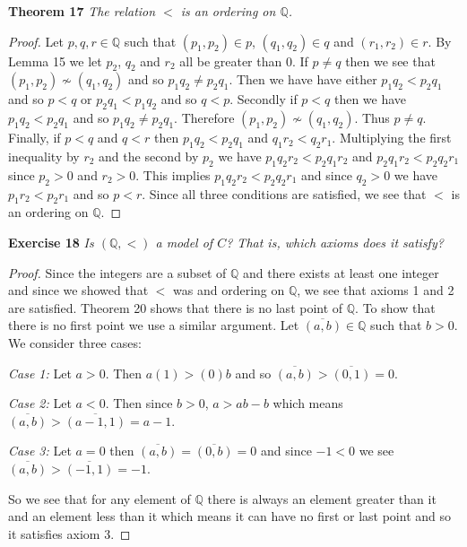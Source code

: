 \documentclass{article}
\begin{document}
\begin{flushleft}
\textbf{Theorem 17}
\textsl{The relation $<$ is an ordering on $\mathbb{Q}$.}
\begin{proof}
Let $p,q,r \in \mathbb{Q}$ such that $(p_1,p_2) \in p$, $(q_1,q_2) \in q$ and $(r_1,r_2) \in r$. By Lemma 15 we let $p_2$, $q_2$ and $r_2$ all be greater than $0$. If $p \neq q$ then we see that $(p_1,p_2) \nsim (q_1,q_2)$ and so $p_1q_2 \neq p_2q_1$. Then we have have either $p_1q_2<p_2q_1$ and so $p<q$ or $p_2q_1<p_1q_2$ and so $q<p$. Secondly if $p<q$ then we have $p_1q_2<p_2q_1$ and so $p_1q_2 \neq p_2q_1$. Therefore $(p_1,p_2) \nsim (q_1,q_2)$. Thus $p \neq q$. Finally, if $p<q$ and $q<r$ then $p_1q_2<p_2q_1$ and $q_1r_2<q_2r_1$. Multiplying the first inequality by $r_2$ and the second by $p_2$ we have $p_1q_2r_2<p_2q_1r_2$ and $p_2q_1r_2<p_2q_2r_1$ since $p_2>0$ and $r_2>0$. This implies $p_1q_2r_2<p_2q_2r_1$ and since $q_2>0$ we have $p_1r_2<p_2r_1$ and so $p<r$. Since all three conditions are satisfied, we see that $<$ is an ordering on $\mathbb{Q}$.
\end{proof}

\textbf{Exercise 18}
\textsl{Is $(\mathbb{Q},<)$ a model of $C$? That is, which axioms does it satisfy?}
\begin{proof}
Since the integers are a subset of $\mathbb{Q}$ and there exists at least one integer and since we showed that $<$ was and ordering on $\mathbb{Q}$, we see that axioms 1 and 2 are satisfied. Theorem 20 shows that there is no last point of $\mathbb{Q}$. To show that there is no first point we use a similar argument. Let $\overline{(a,b)} \in \mathbb{Q}$ such that $b>0$. We consider three cases:\newline

\textsl{Case 1:} Let $a>0$. Then $a(1)>(0)b$ and so $\overline{(a,b)} > \overline{(0,1)} = 0$.\newline

\textsl{Case 2:} Let $a<0$. Then since $b>0$, $a>ab-b$ which means $\overline{(a,b)} > \overline{(a-1,1)} = a-1$.\newline

\textsl{Case 3:} Let $a=0$ then $\overline{(a,b)} = \overline{(0,b)} = 0$ and since $-1<0$ we see $\overline{(a,b)}>\overline{(-1,1)}=-1$.\newline

So we see that for any element of $\mathbb{Q}$ there is always an element greater than it and an element less than it which means it can have no first or last point and so it satisfies axiom 3.
\end{proof}


\end{flushleft}
\end{document}
